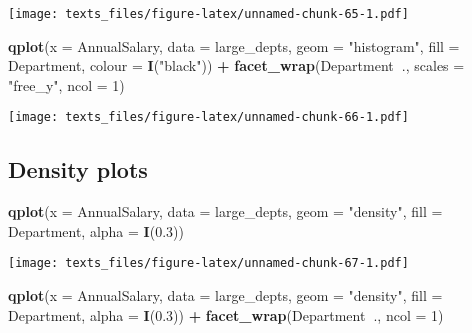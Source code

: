 \documentclass[]{book}
\newenvironment{Shaded}{\begin{snugshade}}{\end{snugshade}}
\newcommand{\DataTypeTok}[1]{\textcolor[rgb]{0.13,0.29,0.53}{#1}}
\newcommand{\DecValTok}[1]{\textcolor[rgb]{0.00,0.00,0.81}{#1}}
\newcommand{\FloatTok}[1]{\textcolor[rgb]{0.00,0.00,0.81}{#1}}
\newcommand{\KeywordTok}[1]{\textcolor[rgb]{0.13,0.29,0.53}{\textbf{#1}}}
\newcommand{\NormalTok}[1]{#1}
\newcommand{\OperatorTok}[1]{\textcolor[rgb]{0.81,0.36,0.00}{\textbf{#1}}}
\newcommand{\StringTok}[1]{\textcolor[rgb]{0.31,0.60,0.02}{#1}}
\begin{document}
\texttt{[image: texts\_files/figure-latex/unnamed-chunk-65-1.pdf]}

\begin{Shaded}
\begin{Highlighting}[]
\KeywordTok{qplot}\NormalTok{(}\DataTypeTok{x =}\NormalTok{ AnnualSalary, }\DataTypeTok{data =}\NormalTok{ large_depts, }\DataTypeTok{geom =} \StringTok{"histogram"}\NormalTok{, }\DataTypeTok{fill =}\NormalTok{ Department, }\DataTypeTok{colour =} \KeywordTok{I}\NormalTok{(}\StringTok{"black"}\NormalTok{)) }\OperatorTok{+}\StringTok{ }
\StringTok{  }\KeywordTok{facet_wrap}\NormalTok{(Department}\OperatorTok{~}\NormalTok{., }\DataTypeTok{scales =} \StringTok{"free_y"}\NormalTok{, }\DataTypeTok{ncol =} \DecValTok{1}\NormalTok{)  }
\end{Highlighting}
\end{Shaded}

\texttt{[image: texts\_files/figure-latex/unnamed-chunk-66-1.pdf]}

\hypertarget{qplotdensity}{%
\subsection*{Density plots}\label{qplotdensity}}

\begin{Shaded}
\begin{Highlighting}[]
\KeywordTok{qplot}\NormalTok{(}\DataTypeTok{x =}\NormalTok{ AnnualSalary, }\DataTypeTok{data =}\NormalTok{ large_depts, }\DataTypeTok{geom =} \StringTok{"density"}\NormalTok{, }\DataTypeTok{fill =}\NormalTok{ Department, }\DataTypeTok{alpha =} \KeywordTok{I}\NormalTok{(}\FloatTok{0.3}\NormalTok{)) }
\end{Highlighting}
\end{Shaded}

\texttt{[image: texts\_files/figure-latex/unnamed-chunk-67-1.pdf]}

\begin{Shaded}
\begin{Highlighting}[]
\KeywordTok{qplot}\NormalTok{(}\DataTypeTok{x =}\NormalTok{ AnnualSalary, }\DataTypeTok{data =}\NormalTok{ large_depts, }\DataTypeTok{geom =} \StringTok{"density"}\NormalTok{, }\DataTypeTok{fill =}\NormalTok{ Department, }\DataTypeTok{alpha =} \KeywordTok{I}\NormalTok{(}\FloatTok{0.3}\NormalTok{)) }\OperatorTok{+}\StringTok{ }
\StringTok{  }\KeywordTok{facet_wrap}\NormalTok{(Department}\OperatorTok{~}\NormalTok{., }\DataTypeTok{ncol =} \DecValTok{1}\NormalTok{)}
\end{Highlighting}
\end{Shaded}
\end{document}
